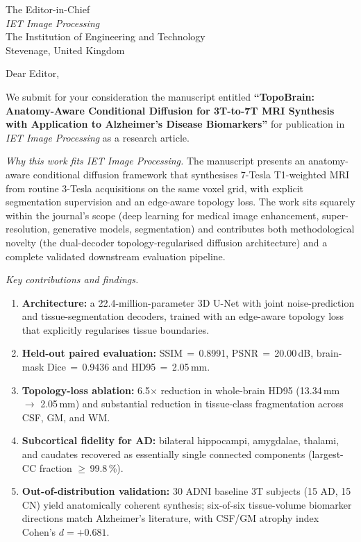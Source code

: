 \documentclass[11pt,a4paper]{letter}
\begin{document}
\begin{letter}{The Editor-in-Chief\\
\textit{IET Image Processing}\\
The Institution of Engineering and Technology\\
Stevenage, United Kingdom}

\opening{Dear Editor,}

We submit for your consideration the manuscript entitled
\textbf{``TopoBrain: Anatomy-Aware Conditional Diffusion for 3T-to-7T
MRI Synthesis with Application to Alzheimer's Disease Biomarkers''}
for publication in \textit{IET Image Processing} as a research
article.

\textit{Why this work fits IET Image Processing.} The manuscript
presents an anatomy-aware conditional diffusion framework that
synthesises 7-Tesla T1-weighted MRI from routine 3-Tesla acquisitions
on the same voxel grid, with explicit segmentation supervision and an
edge-aware topology loss. The work sits squarely within the journal's
scope (deep learning for medical image enhancement, super-resolution,
generative models, segmentation) and contributes both methodological
novelty (the dual-decoder topology-regularised diffusion architecture)
and a complete validated downstream evaluation pipeline.

\textit{Key contributions and findings.}
\begin{enumerate}\itemsep1pt
\item \textbf{Architecture:} a 22.4-million-parameter 3D U-Net with
joint noise-prediction and tissue-segmentation decoders, trained with
an edge-aware topology loss that explicitly regularises tissue
boundaries.
\item \textbf{Held-out paired evaluation:} SSIM\,$=$\,0.8991,
PSNR\,$=$\,20.00\,dB, brain-mask Dice\,$=$\,0.9436 and
HD95\,$=$\,2.05\,mm.
\item \textbf{Topology-loss ablation:} 6.5$\times$ reduction in
whole-brain HD95 (13.34\,mm $\rightarrow$ 2.05\,mm) and substantial
reduction in tissue-class fragmentation across CSF, GM, and WM.
\item \textbf{Subcortical fidelity for AD:} bilateral hippocampi,
amygdalae, thalami, and caudates recovered as essentially single
connected components (largest-CC fraction $\geq$\,99.8\,\%).
\item \textbf{Out-of-distribution validation:} 30 ADNI baseline 3T
subjects (15 AD, 15 CN) yield anatomically coherent synthesis;
six-of-six tissue-volume biomarker directions match Alzheimer's
literature, with CSF/GM atrophy index Cohen's $d=+0.681$.
\end{enumerate}


\end{letter}
\end{document}
